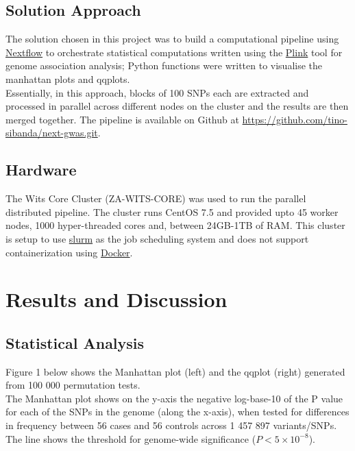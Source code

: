 \documentclass[12pt]{article}
\begin{document}
\subsection{Solution Approach}
The solution chosen in this project was to build a computational pipeline using \href{https://www.nextflow.io}{Nextflow} to orchestrate statistical computations written using the \href{http://zzz.bwh.harvard.edu/plink/}{Plink} tool for genome association analysis; Python functions were written to visualise the manhattan plots and qqplots.\\ 

Essentially, in this approach, blocks of 100 SNPs each are extracted and processed in parallel across different nodes on the cluster and the results are then merged together. The pipeline is available on Github at \href{https://github.com/tino-sibanda/next-gwas.git}{https://github.com/tino-sibanda/next-gwas.git}.

\subsection{Hardware}

The Wits Core Cluster (ZA-WITS-CORE) was used to run the parallel distributed pipeline. The cluster runs CentOS 7.5 and provided upto 45 worker nodes, 1000 hyper-threaded cores and, between 24GB-1TB of RAM. This cluster is setup to use \href{https://slurm.schedmd.com/}{slurm} as the job scheduling system and does not support containerization using \href{https://www.docker.com/}{Docker}.
\newpage

\section{Results and Discussion}

\subsection{Statistical Analysis}
Figure 1 below shows the Manhattan plot (left) and the qqplot (right) generated from 100 000 permutation tests. \\

The Manhattan plot shows on the y-axis the negative log-base-10 of the P value for each of the SNPs in the genome (along the x-axis), when tested for differences in frequency between 56 cases and 56 controls across 1 457 897 variants/SNPs. The line shows the threshold for genome-wide significance ($P<5 \times 10^{-8}$).
\end{document}

